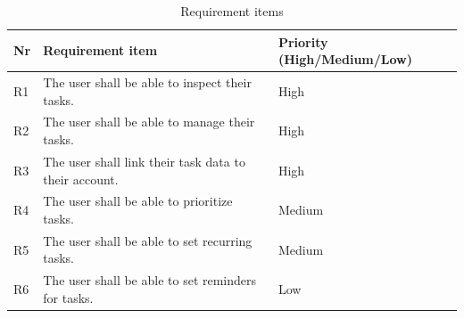 \documentclass{article}
\begin{document}
\begin{table}[h]
  \centering
  \begin{tabularx}{\textwidth}{l|X|l}
    \toprule
    \textbf{Nr} & \textbf{Requirement item}                             & \textbf{Priority (High/Medium/Low)} \\
    \hline\hline
    R1          & The user shall be able to inspect their tasks.        & High                                \\
    \hline
    R2          & The user shall be able to manage their tasks.         & High                                \\
    \hline
    R3          & The user shall link their task data to their account. & High                                \\
    \hline
    R4          & The user shall be able to prioritize tasks.           & Medium                              \\
    \hline
    R5          & The user shall be able to set recurring tasks.        & Medium                              \\
    \hline
    R6          & The user shall be able to set reminders for tasks.    & Low                                 \\
    \bottomrule
  \end{tabularx}
  \caption{Requirement items}
  \label{Requirement items}
\end{table}
\end{document}
